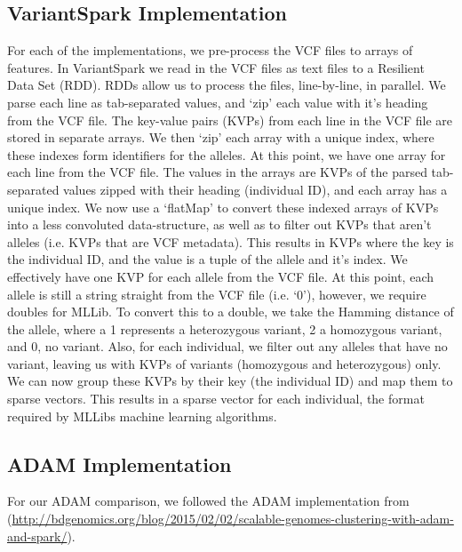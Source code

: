 \documentclass{bmcart}
\newcommand{\variantSpark}{{\sc VariantSpark}}
\begin{document}
\subsection*{VariantSpark Implementation}
For each of the implementations, we pre-process the VCF files to arrays of features.
In \variantSpark{} we read in the VCF files as text files to a Resilient Data Set (RDD). RDDs allow us to process the files, line-by-line, in parallel. We parse each line as tab-separated values, and `zip' each value with it's heading from the VCF file.
The key-value pairs (KVPs) from each line in the VCF file are stored in separate arrays. We then `zip' each array with a unique index, where these indexes form identifiers for the alleles.
At this point, we have one array for each line from the VCF file. The values in the arrays are KVPs of the parsed tab-separated values zipped with their heading (individual ID), and each array has a unique index.
We now use a `flatMap' to convert these indexed arrays of KVPs into a less convoluted data-structure, as well as to filter out KVPs that aren't alleles (i.e. KVPs that are VCF metadata).
This results in KVPs where the key is the individual ID, and the value is a tuple of the allele and it's index. We effectively have one KVP for each allele from the VCF file. At this point, each allele is still a string straight from the VCF file (i.e. `0'), however, we require doubles for MLLib.
To convert this to a double, we take the Hamming distance of the allele, where a 1 represents a heterozygous variant, 2 a homozygous variant, and 0, no variant. Also, for each individual, we filter out any alleles that have no variant, leaving us with KVPs of variants (homozygous and heterozygous) only.
We can now group these KVPs by their key (the individual ID) and map them to sparse vectors. This results in a sparse vector for each individual, the format required by MLLibs machine learning algorithms.


\subsection*{ADAM Implementation}
For our ADAM comparison, we followed the ADAM implementation from (\url{http://bdgenomics.org/blog/2015/02/02/scalable-genomes-clustering-with-adam-and-spark/}).
\end{document}
